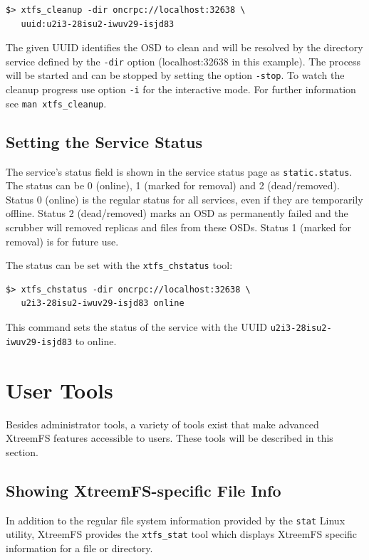 \documentclass[a4paper,10pt]{book}
\begin{document}
\begin{verbatim}
$> xtfs_cleanup -dir oncrpc://localhost:32638 \
   uuid:u2i3-28isu2-iwuv29-isjd83
\end{verbatim}
The given UUID identifies the OSD to clean and will be resolved by the
directory service defined by the \texttt{-dir} option (localhost:32638 in this example).
The process will be started and can be stopped by setting the option
\texttt{-stop}. To watch the cleanup progress use option \texttt{-i} for the
interactive mode. For further information see \texttt{man xtfs\_cleanup}.

\subsection{Setting the Service Status}

The service's status field is shown in the service status page as \texttt{static.status}. The status can be 0 (online), 1 (marked for removal) and 2 (dead/removed). Status 0 (online) is the regular status for all services, even if they are temporarily offline. Status 2 (dead/removed) marks an OSD as permanently failed and the scrubber will removed replicas and files from these OSDs. Status 1 (marked for removal) is for future use.

The status can be set with the \texttt{xtfs\_chstatus} tool:

\begin{verbatim}
$> xtfs_chstatus -dir oncrpc://localhost:32638 \
   u2i3-28isu2-iwuv29-isjd83 online
\end{verbatim}

This command sets the status of the service with the UUID \texttt{u2i3-28isu2-iwuv29-isjd83} to online.

\section{User Tools}

Besides administrator tools, a variety of tools exist that make advanced XtreemFS features accessible to users. These tools will be described in this section.

\subsection{Showing XtreemFS-specific File Info}

In addition to the regular file system information provided by the \texttt{stat} Linux utility, XtreemFS provides the \texttt{xtfs\_stat} tool which displays XtreemFS specific information for a file or directory.
\end{document}
